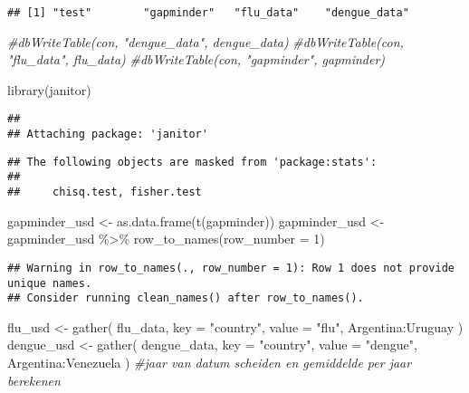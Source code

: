 \documentclass[
]{book}
\newenvironment{Shaded}{\begin{snugshade}}{\end{snugshade}}
\newcommand{\AttributeTok}[1]{\textcolor[rgb]{0.77,0.63,0.00}{#1}}
\newcommand{\CommentTok}[1]{\textcolor[rgb]{0.56,0.35,0.01}{\textit{#1}}}
\newcommand{\DecValTok}[1]{\textcolor[rgb]{0.00,0.00,0.81}{#1}}
\newcommand{\FunctionTok}[1]{\textcolor[rgb]{0.00,0.00,0.00}{#1}}
\newcommand{\NormalTok}[1]{#1}
\newcommand{\OtherTok}[1]{\textcolor[rgb]{0.56,0.35,0.01}{#1}}
\newcommand{\SpecialCharTok}[1]{\textcolor[rgb]{0.00,0.00,0.00}{#1}}
\newcommand{\StringTok}[1]{\textcolor[rgb]{0.31,0.60,0.02}{#1}}
\begin{document}
\begin{verbatim}
## [1] "test"        "gapminder"   "flu_data"    "dengue_data"
\end{verbatim}

\begin{Shaded}
\begin{Highlighting}[]
\CommentTok{\#dbWriteTable(con, "dengue\_data", dengue\_data)}
\CommentTok{\#dbWriteTable(con, "flu\_data", flu\_data)}
\CommentTok{\#dbWriteTable(con, "gapminder", gapminder)}

\FunctionTok{library}\NormalTok{(janitor)}
\end{Highlighting}
\end{Shaded}

\begin{verbatim}
## 
## Attaching package: 'janitor'
\end{verbatim}

\begin{verbatim}
## The following objects are masked from 'package:stats':
## 
##     chisq.test, fisher.test
\end{verbatim}

\begin{Shaded}
\begin{Highlighting}[]
\NormalTok{gapminder\_usd }\OtherTok{\textless{}{-}} \FunctionTok{as.data.frame}\NormalTok{(}\FunctionTok{t}\NormalTok{(gapminder))}
\NormalTok{gapminder\_usd }\OtherTok{\textless{}{-}}\NormalTok{ gapminder\_usd }\SpecialCharTok{\%\textgreater{}\%} \FunctionTok{row\_to\_names}\NormalTok{(}\AttributeTok{row\_number =} \DecValTok{1}\NormalTok{)}
\end{Highlighting}
\end{Shaded}

\begin{verbatim}
## Warning in row_to_names(., row_number = 1): Row 1 does not provide unique names.
## Consider running clean_names() after row_to_names().
\end{verbatim}

\begin{Shaded}
\begin{Highlighting}[]
\NormalTok{flu\_usd }\OtherTok{\textless{}{-}} \FunctionTok{gather}\NormalTok{(}
\NormalTok{  flu\_data,}
  \AttributeTok{key =} \StringTok{"country"}\NormalTok{,}
  \AttributeTok{value =} \StringTok{"flu"}\NormalTok{,}
\NormalTok{  Argentina}\SpecialCharTok{:}\NormalTok{Uruguay}
\NormalTok{)}
\NormalTok{dengue\_usd }\OtherTok{\textless{}{-}} \FunctionTok{gather}\NormalTok{(}
\NormalTok{  dengue\_data,}
  \AttributeTok{key =} \StringTok{"country"}\NormalTok{,}
  \AttributeTok{value =} \StringTok{"dengue"}\NormalTok{,}
\NormalTok{  Argentina}\SpecialCharTok{:}\NormalTok{Venezuela}
\NormalTok{)}
\CommentTok{\#jaar van datum scheiden en gemiddelde per jaar berekenen}
\end{Highlighting}
\end{Shaded}


  
\end{document}
